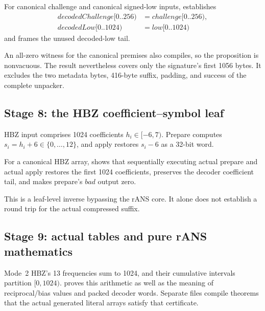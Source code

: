 \begin{verified}
For canonical challenge and canonical signed-low inputs,
 establishes
\begin{align*}
  \mathit{decodedChallenge}[0..256)&=\mathit{challenge}[0..256),\\
  \mathit{decodedLow}[0..1024)&=\mathit{low}[0..1024)
\end{align*}
and frames the unused decoded-low tail.
\end{verified}

An all-zero witness for the canonical premises also compiles, so the
proposition is nonvacuous. The result nevertheless covers only the signature's
first 1056 bytes. It excludes the two metadata bytes, 416-byte suffix, padding,
and success of the complete unpacker.

\subsection{Stage 8: the HBZ coefficient--symbol leaf}

HBZ input comprises 1024 coefficients \(h_i\in[-6,7)\).
Prepare computes \(s_i=h_i+6\in\{0,\ldots,12\}\), and apply restores
\(s_i-6\) as a 32-bit word.

\begin{verified}
For a canonical HBZ array,
 shows that sequentially
executing actual prepare and actual apply restores the first 1024 coefficients,
preserves the decoder coefficient tail, and makes prepare's \(bad\) output zero.
\end{verified}

This is a leaf-level inverse bypassing the rANS core. It alone does not
establish a round trip for the actual compressed suffix.

\subsection{Stage 9: actual tables and pure rANS mathematics}

Mode~2 HBZ's 13 frequencies sum to 1024, and their cumulative intervals
partition \([0,1024)\).
 proves this arithmetic as well as
the meaning of reciprocal/bias values and packed decoder words.
Separate files compile theorems that the actual generated literal arrays
satisfy that certificate.

